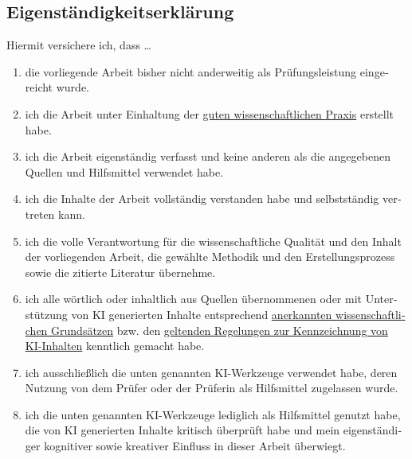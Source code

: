\documentclass[
    pdftex,
    final,
    11pt,
    a4paper,
    parskip=false, %
    twoside, %
    footheight=0mm, %
    footinclude=false,
    toc=bibliography, %
    toc=listof %
]{scrbook} %
\begin{document}
\begin{otherlanguage}{ngerman}
\chapter*{Eigenständigkeitserklärung}
	
Hiermit versichere ich, dass \dots

\begin{enumerate}
    \item die vorliegende Arbeit bisher nicht anderweitig als Prüfungsleistung eingereicht wurde.
    \item ich die Arbeit unter Einhaltung der \href{https://www.wissenschaftliche-integritaet.de/de/kodex}{guten wissenschaftlichen Praxis} erstellt habe.
    \item ich die Arbeit eigenständig verfasst und keine anderen als die angegebenen Quellen und Hilfsmittel verwendet habe.
    \item ich die Inhalte der Arbeit vollständig verstanden habe und selbstständig vertreten kann.
    \item ich die volle Verantwortung für die wissenschaftliche Qualität und den Inhalt der vorliegenden Arbeit, die gewählte Methodik und den Erstellungsprozess sowie die zitierte Literatur übernehme.
    \item ich alle wörtlich oder inhaltlich aus Quellen übernommenen oder mit Unterstützung von KI generierten Inhalte entsprechend \href{https://backend.uni-heidelberg.de/de/dokumente/satzung-zur-sicherung-guter-wissenschaftlicher-praxis-und-zum-umgang-mit-fehlverhalten-in-der/download}{anerkannten wissenschaftlichen Grundsätzen} bzw. den \href{https://backend.heiskills.uni-heidelberg.de/de/dokumente/ki-leitlinie-de/download}{geltenden Regelungen zur Kennzeichnung von KI-Inhalten} kenntlich gemacht habe.
    \item ich ausschließlich die unten genannten KI-Werkzeuge verwendet habe, deren Nutzung von dem Prüfer oder der Prüferin als Hilfsmittel zugelassen wurde.
    \item ich die unten genannten KI-Werkzeuge lediglich als Hilfsmittel genutzt habe, die von KI generierten Inhalte kritisch überprüft habe und mein eigenständiger kognitiver sowie kreativer Einfluss in dieser Arbeit überwiegt.
\end{enumerate}


\end{otherlanguage}
\end{document}
